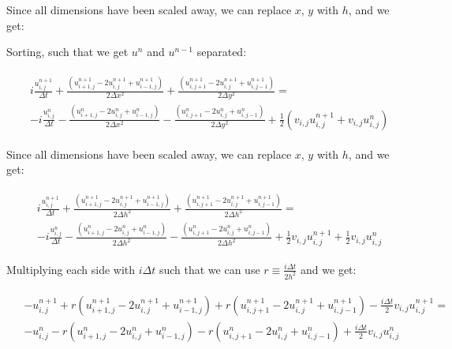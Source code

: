 \documentclass[english,notitlepage,reprint,nofootinbib]{revtex4-1}  %
\begin{document}
	Since all dimensions have been scaled away, we can replace $x$, $y$ with $h$, and we get:
	
	Sorting, such that we get $u^n$ and $u^{n-1}$ separated:
	
	\begin{align}
		\begin{split}
			&i \frac{u_{i,j}^{n+1}}{\Delta t} + \frac{\left( u_{i+1, j}^{n+1} - 2u_{i, j}^{n+1} + u_{i-1, j}^{n+1} \right)}{2 \Delta x^2} + \frac{\left( u_{i, j+1}^{n+1} - 2u_{i, j}^{n+1} + u_{i, j-1}^{n+1} \right)}{2 \Delta y^2} = \\
			&- i \frac{u_{i,j}^{n}}{\Delta t} - \frac{\left( u_{i+1, j}^{n} - 2u_{i, j}^{n} + u_{i-1, j}^{n} \right)}{2 \Delta x^2} - \frac{\left( u_{i, j+1}^{n} - 2u_{i, j}^{n} + u_{i, j-1}^{n} \right)}{2 \Delta y^2} + \frac{1}{2} \left(v_{i,j} u_{i,j}^{n+1} + v_{i,j} u_{i,j}^n\right)
		\end{split}
	\end{align}
	
	Since all dimensions have been scaled away, we can replace $x$, $y$ with $h$, and we get:
	
	\begin{align}
		\begin{split}
			&i \frac{u_{i,j}^{n+1}}{\Delta t} + \frac{\left( u_{i+1, j}^{n+1} - 2u_{i, j}^{n+1} + u_{i-1, j}^{n+1} \right)}{2 \Delta h^2} + \frac{\left( u_{i, j+1}^{n+1} - 2u_{i, j}^{n+1} + u_{i, j-1}^{n+1} \right)}{2 \Delta h^2} = \\
			&- i \frac{u_{i,j}^{n}}{\Delta t} - \frac{\left( u_{i+1, j}^{n} - 2u_{i, j}^{n} + u_{i-1, j}^{n} \right)}{2 \Delta h^2} - \frac{\left( u_{i, j+1}^{n} - 2u_{i, j}^{n} + u_{i, j-1}^{n} \right)}{2 \Delta h^2} + \frac{1}{2} v_{i,j} u_{i,j}^{n+1} + \frac{1}{2} v_{i,j} u_{i,j}^n
		\end{split}
	\end{align}
	
	Multiplying each side with $i \Delta t$ such that we can use $r \equiv \frac{i \Delta t}{2h^2}$ and we get:
	
	\begin{align}
		\begin{split}
			&- u_{i,j}^{n+1} + r \left( u_{i+1, j}^{n+1} - 2u_{i, j}^{n+1} + u_{i-1, j}^{n+1} \right) + r \left( u_{i, j+1}^{n+1} - 2u_{i, j}^{n+1} + u_{i, j-1}^{n+1} \right) - \frac{i \Delta t}{2} v_{i,j} u_{i,j}^{n+1} = \\
			&- u_{i,j}^{n} - r \left( u_{i+1, j}^{n} - 2u_{i, j}^{n} + u_{i-1, j}^{n} \right) - r \left( u_{i, j+1}^{n} - 2u_{i, j}^{n} + u_{i, j-1}^{n} \right) + \frac{i \Delta t}{2} v_{i,j} u_{i,j}^n
		\end{split}
	\end{align}
	
\end{document}
